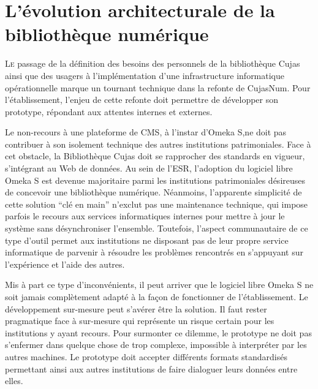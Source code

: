 \chapter[L'architecture du prototype]{L'évolution architecturale de la bibliothèque numérique}
\lettrine{L}e passage de la définition des besoins des personnels de la bibliothèque Cujas ainsi que des usagers à l'implémentation d'une infrastructure informatique opérationnelle marque un tournant technique dans la refonte de CujasNum. Pour l'établissement, l'enjeu de cette refonte doit permettre de développer son prototype, répondant aux attentes internes et externes.

Le non-recours à une plateforme de \ac{CMS}, à l'instar d'Omeka S,ne doit pas contribuer à son isolement technique des autres institutions patrimoniales. Face à cet obstacle, la Bibliothèque Cujas doit se rapprocher des standards en vigueur, s'intégrant au Web de données. Au sein de l’\ac{ESR}, l'adoption du logiciel libre Omeka S est devenue majoritaire parmi les institutions patrimoniales désireuses de concevoir une bibliothèque numérique. Néanmoins, l'apparente simplicité de cette solution \enquote{clé en main} n'exclut pas une maintenance technique, qui impose parfois le recours aux services informatiques internes pour mettre à jour le système sans désynchroniser l'ensemble. Toutefois, l'aspect communautaire de ce type d'outil permet aux institutions ne disposant pas de leur propre service informatique de parvenir à résoudre les problèmes rencontrés en s'appuyant sur l'expérience et l'aide des autres.

Mis à part ce type d'inconvénients, il peut arriver que le logiciel libre Omeka S ne soit jamais complètement adapté à la façon de fonctionner de l'établissement. Le développement sur-mesure peut s'avérer être la solution. Il faut rester pragmatique face à sur-mesure qui représente un risque certain pour les institutions y ayant recours. Pour surmonter ce dilemme, le prototype ne doit pas s'enfermer dans quelque chose de trop complexe, impossible à interpréter par les autres machines. Le prototype doit accepter différents formats standardisés permettant ainsi aux autres institutions de faire dialoguer leurs données entre elles.


